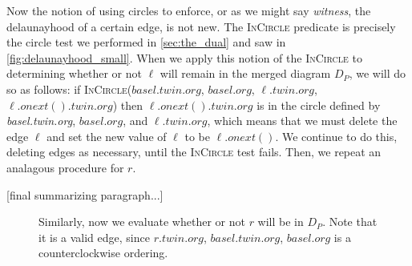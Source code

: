 \documentclass[12pt,twoside]{reedthesis}
\begin{document}
      Now the notion of using circles to enforce, or as we might say \emph{witness}, the delaunayhood of a certain edge, is not new. The \textsc{InCircle} predicate is precisely the circle test we performed in \cref{sec:the_dual} and saw in \cref{fig:delaunayhood_small}. When we apply this notion of the \textsc{InCircle} to determining whether or not $\ell$ will remain in the merged diagram $D_{P}$, we will do so as follows: if \textsc{InCircle}($basel.twin.org$, $basel.org$, $\ell.twin.org$, $\ell.onext().twin.org$) then $\ell.onext().twin.org$ is in the circle defined by \emph{basel.twin.org}, $basel.org$, and $\ell.twin.org$, which means that we must delete the edge $\ell$ and set the new value of $\ell$ to be $\ell.onext()$. We continue to do this, deleting edges as necessary, until the \textsc{InCircle} test fails. Then, we repeat an analagous procedure for $r$.

      [final summarizing paragraph...]
      \begin{figure}[!htb]
        \ContinuedFloat
        \centering
          \begin{subtable}{\textwidth}
          \centering
          
          \caption{Similarly, now we evaluate whether or not $r$ will be in $D_{P}$. Note that it is a valid edge, since $r.twin.org$, $basel.twin.org$, $basel.org$ is a counterclockwise ordering.}
          \label{fig:del_knit2}
        \end{subtable}
      \end{figure}
\end{document}
